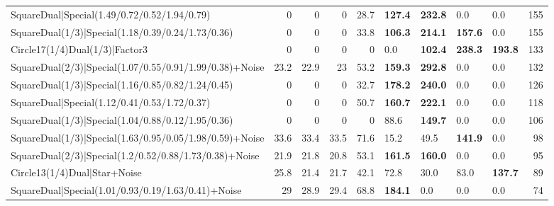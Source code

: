 \begin{tabular}{lrrrrllllr}
 SquareDual|Special(1.49/0.72/0.52/1.94/0.79)            &          0   &          0   &          0   &            28.7 & \textbf{127.4} & \textbf{232.8} & 0.0            & 0.0             &          155 \\
 SquareDual(1/3)|Special(1.18/0.39/0.24/1.73/0.36)       &          0   &          0   &          0   &            33.8 & \textbf{106.3} & \textbf{214.1} & \textbf{157.6} & 0.0             &          155 \\
 Circle17(1/4)Dual(1/3)|Factor3                          &          0   &          0   &          0   &             0   & 0.0            & \textbf{102.4} & \textbf{238.3} & \textbf{193.8}  &          133 \\
 SquareDual(2/3)|Special(1.07/0.55/0.91/1.99/0.38)+Noise &         23.2 &         22.9 &         23   &            53.2 & \textbf{159.3} & \textbf{292.8} & 0.0            & 0.0             &          132 \\
 SquareDual(1/3)|Special(1.16/0.85/0.82/1.24/0.45)       &          0   &          0   &          0   &            32.7 & \textbf{178.2} & \textbf{240.0} & 0.0            & 0.0             &          126 \\
 SquareDual|Special(1.12/0.41/0.53/1.72/0.37)            &          0   &          0   &          0   &            50.7 & \textbf{160.7} & \textbf{222.1} & 0.0            & 0.0             &          118 \\
 SquareDual(1/3)|Special(1.04/0.88/0.12/1.95/0.36)       &          0   &          0   &          0   &             0   & 88.6           & \textbf{149.7} & 0.0            & 0.0             &          106 \\
 SquareDual(1/3)|Special(1.63/0.95/0.05/1.98/0.59)+Noise &         33.6 &         33.4 &         33.5 &            71.6 & 15.2           & 49.5           & \textbf{141.9} & 0.0             &           98 \\
 SquareDual(2/3)|Special(1.2/0.52/0.88/1.73/0.38)+Noise  &         21.9 &         21.8 &         20.8 &            53.1 & \textbf{161.5} & \textbf{160.0} & 0.0            & 0.0             &           95 \\
 Circle13(1/4)Dual|Star+Noise                            &         25.8 &         21.4 &         21.7 &            42.1 & 72.8           & 30.0           & 83.0           & \textbf{137.7}  &           89 \\
 SquareDual|Special(1.01/0.93/0.19/1.63/0.41)+Noise      &         29   &         28.9 &         29.4 &            68.8 & \textbf{184.1} & 0.0            & 0.0            & 0.0             &           74 \\

\end{tabular}
